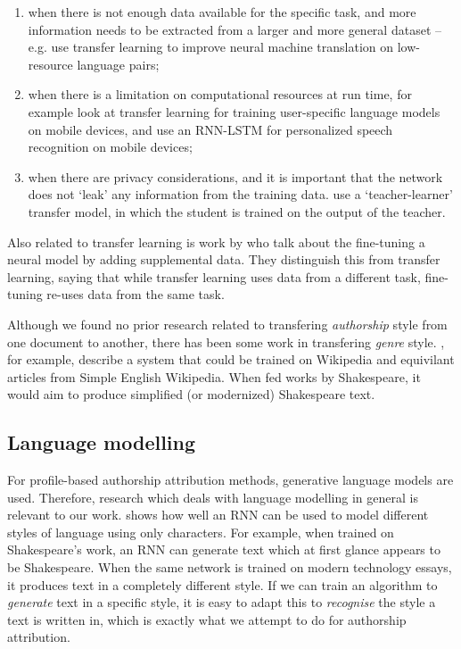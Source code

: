 \begin{enumerate}
    \item when there is not enough data available for the specific task, and more information needs to be extracted from a larger and more general dataset -- e.g. \citep{zoph2016transfer} use transfer learning to improve neural machine translation on low-resource language pairs;
    \item when there is a limitation on computational resources at run time, for example \citep{yoon2017efficient} look at transfer learning for training user-specific language models on mobile devices, and 
\cite{mcgraw2016personalized} use an RNN-LSTM for personalized speech recognition on mobile devices;
    \item when there are privacy considerations, and it is important that the network does not `leak' any information from the training data. \citep{shin2016generative} use a `teacher-learner' transfer model, in which the student is trained on the output of the teacher.
\end{enumerate}

Also related to transfer learning is work by 
\citep{lalor2017improving} who talk about the fine-tuning a neural model by adding supplemental data. 
They distinguish this from transfer learning, saying that while transfer learning uses data from a different task, 
fine-tuning re-uses data from the same task.

Although we found no prior research related to transfering \textit{authorship} style from one document to another, there has been some work in transfering \textit{genre} style.
\citep{kabbara2016stylistic}, for example, describe a system that could be trained on Wikipedia and equivilant articles from Simple English Wikipedia. When fed works by Shakespeare, it would aim to produce simplified (or modernized) Shakespeare text. 


\subsection*{Language modelling}

For profile-based authorship attribution methods, generative language models are used. Therefore, research which deals with language modelling in general is relevant to our work.
\citep{karpathy2015unreasonable2} shows how well an RNN can be used to model different styles of language using only characters. For example, when trained on Shakespeare's work, an RNN can generate text 
which at first glance appears to be Shakespeare. When the same network is trained on modern technology essays, it produces text in a completely different style. 
If we can train an algorithm to \textit{generate} text in a specific style, it is easy to adapt this to \textit{recognise} the style a text is written in, which is exactly what we attempt to do for authorship attribution. 



